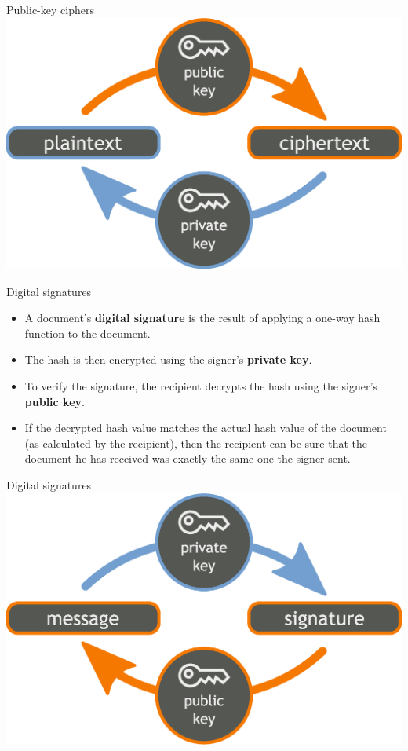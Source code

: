 \documentclass[%
mode=present,%
paper=smartboard,
size=20pt,
]{powerdot}
\begin{document}
\begin{slide}[toc=]{Public-key ciphers}
\centering\includegraphics[width=0.9\linewidth]{images/Orange_blue_public_key_cryptography_en.eps}
\end{slide}

\begin{slide}{Digital signatures}
  \begin{itemize}
  \item A document's \textbf{digital signature} is the result of
    applying a one-way hash function to the document.
  \item The hash is then encrypted using the signer's \textbf{private
      key}.
  \item To verify the signature, the recipient decrypts the hash using
    the signer's \textbf{public key}.
  \item If the decrypted hash value matches the actual hash value of
    the document (as calculated by the recipient), then the recipient
    can be sure that the document he has received was exactly the same
    one the signer sent.
  \end{itemize}
\end{slide}

\begin{slide}[toc=]{Digital signatures}
\centering\includegraphics[width=0.9\linewidth]{images/Orange_blue_digital_signature_en.eps}
\end{slide}
\end{document}
